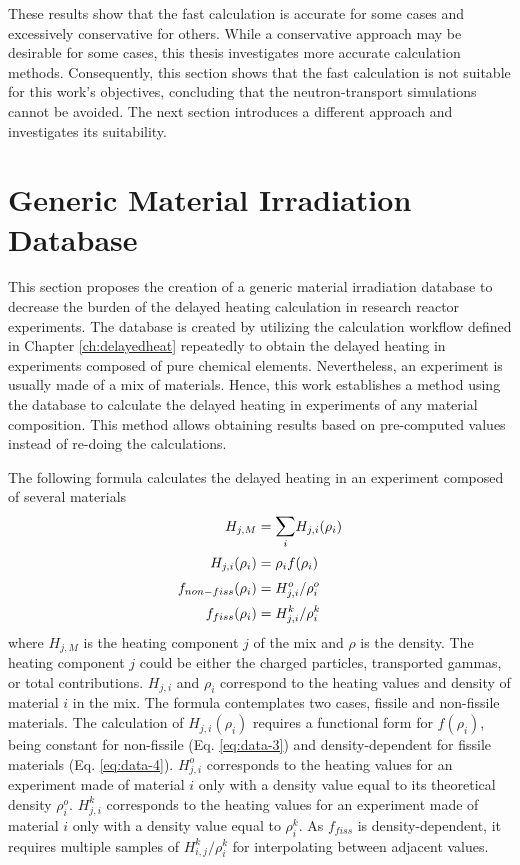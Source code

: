 These results show that the fast calculation is accurate for some cases and excessively conservative for others.
While a conservative approach may be desirable for some cases, this thesis investigates more accurate calculation methods.
Consequently, this section shows that the fast calculation is not suitable for this work's objectives, concluding that the neutron-transport simulations cannot be avoided.
The next section introduces a different approach and investigates its suitability.


\section{Generic Material Irradiation Database}
\label{sec:irradatabase}

This section proposes the creation of a generic material irradiation database to decrease the burden of the delayed heating calculation in research reactor experiments.
The database is created by utilizing the calculation workflow defined in Chapter \ref{ch:delayedheat} repeatedly to obtain the delayed heating in experiments composed of pure chemical elements.
Nevertheless, an experiment is usually made of a mix of materials.
Hence, this work establishes a method using the database to calculate the delayed heating in experiments of any material composition.
This method allows obtaining results based on pre-computed values instead of re-doing the calculations.

The following formula calculates the delayed heating in an experiment composed of several materials
\begin{align}
H_{j,M} &= \mathlarger{\sum}_i H_{j,i}(\rho_i)  \label{eq:data-1} \\
H_{j,i}(\rho_i) &= \rho_i f(\rho_i)  \label{eq:data-2} \\
f_{non-fiss}(\rho_i) &= H_{j,i}^o / \rho_i^o  \label{eq:data-3} \\
f_{fiss}(\rho_i) &= H_{j,i}^k / \rho_i^k  \label{eq:data-4}
\end{align}
where $H_{j, M}$ is the heating component $j$ of the mix and $\rho$ is the density.
The heating component $j$ could be either the charged particles, transported gammas, or total contributions.
$H_{j,i}$ and $\rho_i$ correspond to the heating values and density of material $i$ in the mix.
The formula contemplates two cases, fissile and non-fissile materials.
The calculation of $H_{j,i}(\rho_i)$ requires a functional form for $f(\rho_i)$, being constant for non-fissile (Eq. \ref{eq:data-3}) and density-dependent for fissile materials (Eq. \ref{eq:data-4}).
$H_{j,i}^o$ corresponds to the heating values for an experiment made of material $i$ only with a density value equal to its theoretical density $\rho_i^o$.
$H_{j,i}^k$ corresponds to the heating values for an experiment made of material $i$ only with a density value equal to $\rho_i^k$.
As $f_{fiss}$ is density-dependent, it requires multiple samples of $H_{i,j}^k/\rho_i^k$ for interpolating between adjacent values.

